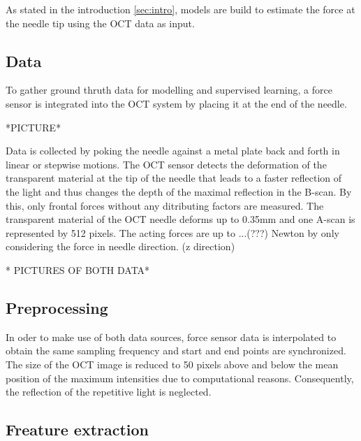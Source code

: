 

As stated in the introduction \ref{sec:intro}, models are build to estimate the force at the needle tip 
using the OCT data as input.

\subsection{Data}
To gather ground thruth data for modelling and supervised learning, a force sensor is 
integrated into the OCT system by placing it at the end of the needle.

*PICTURE*

Data is collected by poking the needle against a metal plate back and forth in linear or stepwise motions.
The OCT sensor detects the deformation of the transparent material at the tip of the needle that leads to a faster reflection of the light and thus
changes the depth of the maximal reflection in the B-scan.
By this, only frontal forces without any ditributing factors are measured.
The transparent material of the OCT needle deforms up to 0.35mm and one A-scan is represented by 512 pixels.
The acting forces are up to ...(???) Newton by only considering the force in needle direction. (z direction)

* PICTURES OF BOTH DATA*

\subsection{Preprocessing}

In oder to make use of both data sources, force sensor data is interpolated to obtain the same sampling frequency and start
and end points are synchronized.
The size of the OCT image is reduced to 50 pixels above and below the mean position of the maximum intensities due to
computational reasons. Consequently, the reflection of the repetitive light is neglected.

\subsection{Freature extraction}


